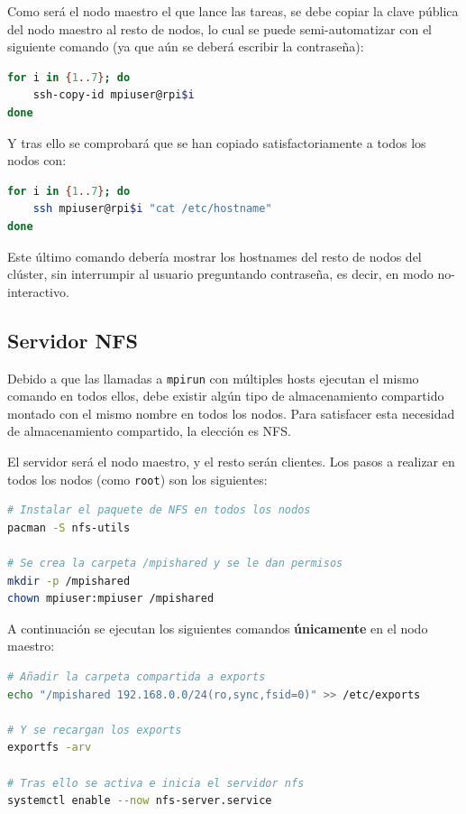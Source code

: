 Como será el nodo maestro el que lance las tareas, se debe copiar la clave pública del nodo maestro al resto de nodos, lo cual se puede semi-automatizar con el siguiente comando (ya que aún se deberá escribir la contraseña):

\begin{lstlisting}[language=bash]
for i in {1..7}; do
    ssh-copy-id mpiuser@rpi$i
done
\end{lstlisting}

Y tras ello se comprobará que se han copiado satisfactoriamente a todos los nodos con:
\begin{lstlisting}[language=bash]
for i in {1..7}; do
    ssh mpiuser@rpi$i "cat /etc/hostname"
done
\end{lstlisting}
Este último comando debería mostrar los hostnames del resto de nodos del clúster, sin interrumpir al usuario preguntando contraseña, es decir, en modo no-interactivo.


\subsection{Servidor NFS}
\label{ssec:serv_nfs}
Debido a que las llamadas a \texttt{mpirun} con múltiples hosts ejecutan el mismo comando en todos ellos, debe existir algún tipo de almacenamiento compartido montado con el mismo nombre en todos los nodos. Para satisfacer esta necesidad de almacenamiento compartido, la elección es NFS.

El servidor será el nodo maestro, y el resto serán clientes. Los pasos a realizar en todos los nodos (como \texttt{root}) son los siguientes:

\begin{lstlisting}[language=bash]
# Instalar el paquete de NFS en todos los nodos
pacman -S nfs-utils

# Se crea la carpeta /mpishared y se le dan permisos
mkdir -p /mpishared
chown mpiuser:mpiuser /mpishared
\end{lstlisting}

A continuación se ejecutan los siguientes comandos \textbf{únicamente} en el nodo maestro:

\begin{lstlisting}[language=bash]
# Añadir la carpeta compartida a exports
echo "/mpishared 192.168.0.0/24(ro,sync,fsid=0)" >> /etc/exports

# Y se recargan los exports
exportfs -arv

# Tras ello se activa e inicia el servidor nfs
systemctl enable --now nfs-server.service
\end{lstlisting}

